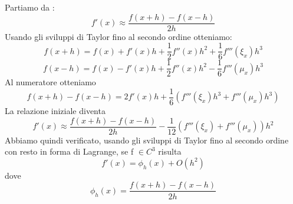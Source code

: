 Partiamo da :
	\[
	f'(x) \approx \frac{f(x+h) - f(x-h)}{2h}
	\]
Usando gli sviluppi di Taylor fino al secondo ordine otteniamo:
	\[
	f(x+h) = f(x) + f'(x)h + \frac{1}{2} f''(x)h^{2} + \frac{1}{6}f'''(\xi_x)h^{3}
	\]
	\[f(x-h) = f(x) - f'(x)h + \frac{1}{2} f''(x)h^{2} - \frac{1}{6}f'''(\mu_x)h^{3}
	\]
Al numeratore otteniamo
	\[
	f(x+h) - f(x-h) = 2f'(x)h + \frac{1}{6}(f'''(\xi_x)h^{3}+f'''(\mu_x)h^{3})
	\]
La relazione iniziale diventa
	\[
	f'(x) \approx \frac{f(x+h) - f(x-h)}{2h} - \frac{1}{12}(f'''(\xi_x) + f'''(\mu_x))h^{2}
	\]
Abbiamo quindi verificato, usando gli sviluppi di Taylor fino al secondo ordine con resto in forma di Lagrange, se f $\in C^{3}$ risulta
	\[
	f'(x) = \phi_h(x) + O(h^2)
	\]
dove
	\[
	\phi_h(x) = \frac{f(x+h) - f(x-h)}{2h}
	\]
